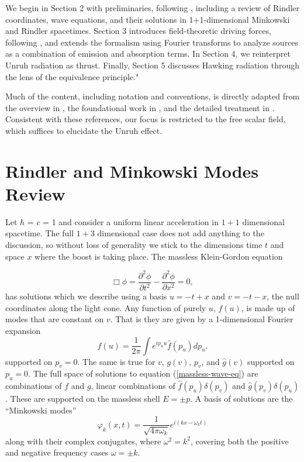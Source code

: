 \documentclass[12pt,a4paper]{article}
\begin{document}
We begin in Section 2 with preliminaries, following \cite{Frodden}, including a review of Rindler coordinates, wave equations, and their solutions in 1+1-dimensional Minkowski and Rindler spacetimes. Section 3 introduces field-theoretic driving forces, following \cite{beisert}, and extends the formalism using Fourier transforms to analyze sources as a combination of emission and absorption terms. In Section 4, we reinterpret Unruh radiation as thrust. Finally, Section 5 discusses Hawking radiation through the lens of the equivalence principle."



Much of the content, including notation and conventions, is directly adapted from the overview in \cite{Frodden}, the foundational work in \cite{unruh}, and the detailed treatment in \cite{beisert}. Consistent with these references, our focus is restricted to the free scalar field, which suffices to elucidate the Unruh effect.

\section{Rindler and Minkowski Modes Review}

Let $\hbar$ = $c$ = 1 and consider a uniform linear acceleration in $1+1$ dimensional spacetime. The full $1+3$ dimensional case does not add anything to the discussion, so without loss of generality we stick to the dimensions time $t$ and space $x$ where the boost is taking place.  The massless Klein-Gordon equation 

\begin{equation}
  \Box \phi = \frac{\partial^2 \phi}{\partial t^2} - \frac{\partial^2 \phi}{\partial x^2} = 0,
 \label{massless-wave-eq}
\end{equation}
has solutions which we describe using a basis  $u = -t + x$ and $v = -t - x$, the null coordinates along the light cone.  Any function of purely $u$, $f(u)$, is made up of modes that are constant on $v$.  That is they are given by a 1-dimensional Fourier expansion
\begin{equation}
  f(u) = \frac{1}{2\pi} \int{e^{i p_u u} \hat{f}(p_u) dp_u}.
\end{equation}
supported on $p_v = 0$.  The same is true for $v$, $g(v)$, $p_v$, and $\hat{g}(v)$ supported on $p_u = 0$.  The full space of solutions to equation (\ref{massless-wave-eq}) are combinations of $f$ and $g$, linear combinations of $\hat{f}(p_u) \delta(p_v)$ and $\hat{g}(p_v) \delta(p_u)$.  These are supported on the massless shell $E = \pm p$.  A basis of solutions are the ``Minkowski modes''
\begin{equation}
  \varphi_k(x,t) = \frac{1}{\sqrt{4 \pi \omega_k}} e^{i(k x - \omega_k t)}
\end{equation}
along with their complex conjugates, where $\omega^2 = k^2$, covering both the positive and negative frequency cases $\omega = \pm k$.
\end{document}
